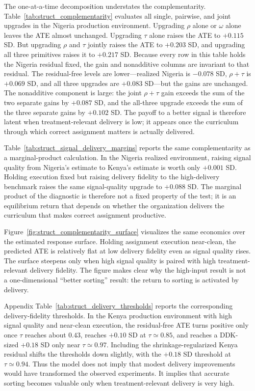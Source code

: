 \documentclass[11pt]{article}
\begin{document}
The one-at-a-time decomposition understates the complementarity. Table~\ref{tab:struct_complementarity} evaluates all single, pairwise, and joint upgrades in the Nigeria production environment. Upgrading $\rho$ alone or $\omega$ alone leaves the ATE almost unchanged. Upgrading $\tau$ alone raises the ATE to $+0.115$ SD. But upgrading $\rho$ and $\tau$ jointly raises the ATE to $+0.203$ SD, and upgrading all three primitives raises it to $+0.217$ SD. Because every row in this table holds the Nigeria residual fixed, the gain and nonadditive columns are invariant to that residual. The residual-free levels are lower---realized Nigeria is $-0.078$ SD, $\rho+\tau$ is $+0.069$ SD, and all three upgrades are $+0.083$ SD---but the gains are unchanged. The nonadditive component is large: the joint $\rho+\tau$ gain exceeds the sum of the two separate gains by $+0.087$ SD, and the all-three upgrade exceeds the sum of the three separate gains by $+0.102$ SD. The payoff to a better signal is therefore latent when treatment-relevant delivery is low; it appears once the curriculum through which correct assignment matters is actually delivered.



Table~\ref{tab:struct_signal_delivery_margins} reports the same complementarity as a marginal-product calculation. In the Nigeria realized environment, raising signal quality from Nigeria's estimate to Kenya's estimate is worth only $+0.001$ SD. Holding execution fixed but raising delivery fidelity to the high-delivery benchmark raises the same signal-quality upgrade to $+0.088$ SD. The marginal product of the diagnostic is therefore not a fixed property of the test; it is an equilibrium return that depends on whether the organization delivers the curriculum that makes correct assignment productive.



Figure~\ref{fig:struct_complementarity_surface} visualizes the same economics over the estimated response surface. Holding assignment execution near-clean, the predicted ATE is relatively flat at low delivery fidelity even as signal quality rises. The surface steepens only when high signal quality is paired with high treatment-relevant delivery fidelity. The figure makes clear why the high-input result is not a one-dimensional ``better sorting'' result: the return to sorting is activated by delivery.

Appendix Table~\ref{tab:struct_delivery_thresholds} reports the corresponding delivery-fidelity thresholds. In the Kenya production environment with high signal quality and near-clean execution, the residual-free ATE turns positive only once $\tau$ reaches about $0.43$, reaches $+0.10$ SD at $\tau \simeq 0.85$, and reaches a DDK-sized $+0.18$ SD only near $\tau \simeq 0.97$. Including the shrinkage-regularized Kenya residual shifts the thresholds down slightly, with the $+0.18$ SD threshold at $\tau \simeq 0.94$. Thus the model does not imply that modest delivery improvements would have transformed the observed experiments. It implies that accurate sorting becomes valuable only when treatment-relevant delivery is very high.
\end{document}
